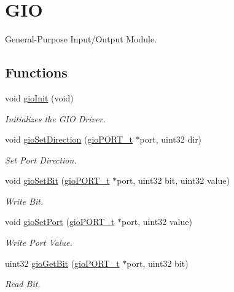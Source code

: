 \hypertarget{group__GIO}{}\section{G\+IO}
\label{group__GIO}


General-\/\+Purpose Input/\+Output Module.  


\subsection*{Functions}
\begin{DoxyCompactItemize}
\item 
void \mbox{\hyperlink{group__GIO_ga3a5c5cc04b0105eb43cf8f5556e8207e}{gio\+Init}} (void)
\begin{DoxyCompactList}\small\item\em Initializes the G\+IO Driver. \end{DoxyCompactList}\item 
void \mbox{\hyperlink{group__GIO_ga0eb9c6b99f383108e0e9ae15e5fd1450}{gio\+Set\+Direction}} (\mbox{\hyperlink{reg__gio_8h_ad276ab0b3bc4719e20bc91adf2bfcfe7}{gio\+P\+O\+R\+T\+\_\+t}} $\ast$port, uint32 dir)
\begin{DoxyCompactList}\small\item\em Set Port Direction. \end{DoxyCompactList}\item 
void \mbox{\hyperlink{group__GIO_ga976443b96aca877a030f1e38865f6e44}{gio\+Set\+Bit}} (\mbox{\hyperlink{reg__gio_8h_ad276ab0b3bc4719e20bc91adf2bfcfe7}{gio\+P\+O\+R\+T\+\_\+t}} $\ast$port, uint32 bit, uint32 value)
\begin{DoxyCompactList}\small\item\em Write Bit. \end{DoxyCompactList}\item 
void \mbox{\hyperlink{group__GIO_gacc590bf80401dda7f74995de1fc14bf2}{gio\+Set\+Port}} (\mbox{\hyperlink{reg__gio_8h_ad276ab0b3bc4719e20bc91adf2bfcfe7}{gio\+P\+O\+R\+T\+\_\+t}} $\ast$port, uint32 value)
\begin{DoxyCompactList}\small\item\em Write Port Value. \end{DoxyCompactList}\item 
uint32 \mbox{\hyperlink{group__GIO_gaa8da3702193326982ea93af3f1e505fd}{gio\+Get\+Bit}} (\mbox{\hyperlink{reg__gio_8h_ad276ab0b3bc4719e20bc91adf2bfcfe7}{gio\+P\+O\+R\+T\+\_\+t}} $\ast$port, uint32 bit)
\begin{DoxyCompactList}\small\item\em Read Bit. \end{DoxyCompactList}\item 

\end{DoxyCompactItemize}
